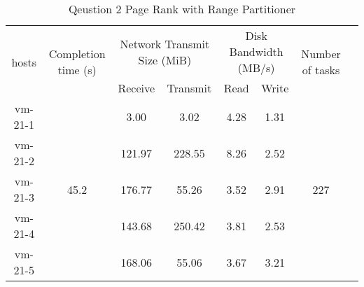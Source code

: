 \begin{enumerate}[label=Question \arabic*.]
    \begin{table}[!h]
       	\centering
       	\begin{tabular}{|c|c|c|c|c|c|c|c|}
       		\hline
       		\multirow{2}{*}{hosts} & \multirow{2}{*}{Completion time (s)} & \multicolumn{2}{|c|}{Network Transmit Size (MiB)} & \multicolumn{2}{|c|}{Disk Bandwidth (MB/s)} & \multirow{2}{*}{Number of tasks} \\ 
       		\cline{3-6}
       		& & Receive & Transmit & Read & Write &  \\
       		\hline
    		vm-21-1 & \multirow{5}{*}{45.2}  & 3.00   & 3.02   & 4.28 & 1.31 & \multirow{5}{*}{227}  \\
    		vm-21-2 &                        & 121.97 & 228.55 & 8.26 & 2.52 &  \\
    		vm-21-3 &                        & 176.77 & 55.26  & 3.52 & 2.91 &  \\
    		vm-21-4 &                        & 143.68 & 250.42 & 3.81 & 2.53 &  \\
    		vm-21-5 &                        & 168.06 & 55.06  & 3.67 & 3.21 &  \\
       		\hline
       	\end{tabular}
       	\caption{Qeustion 2 Page Rank with Range Partitioner}
       	\label{tab:q2:range}
    \end{table}


\end{enumerate}
